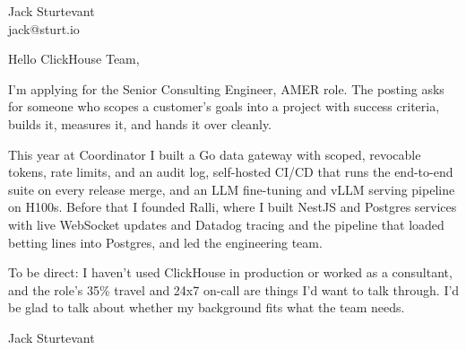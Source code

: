\documentclass[11pt]{article}
\begin{document}
\raggedright

{\namefont\fontsize{20pt}{24pt}\selectfont Jack Sturtevant}\\[-0.3em]
jack@sturt.io

\vspace{1.2em}

Hello ClickHouse Team,

I'm applying for the Senior Consulting Engineer, AMER role. The posting asks for someone who scopes a customer's goals into a project with success criteria, builds it, measures it, and hands it over cleanly.

This year at Coordinator I built a Go data gateway with scoped, revocable tokens, rate limits, and an audit log, self-hosted CI/CD that runs the end-to-end suite on every release merge, and an LLM fine-tuning and vLLM serving pipeline on H100s. Before that I founded Ralli, where I built NestJS and Postgres services with live WebSocket updates and Datadog tracing and the pipeline that loaded betting lines into Postgres, and led the engineering team.

To be direct: I haven't used ClickHouse in production or worked as a consultant, and the role's 35\% travel and 24x7 on-call are things I'd want to talk through. I'd be glad to talk about whether my background fits what the team needs.

\vspace{0.6em}
Jack Sturtevant
\end{document}
